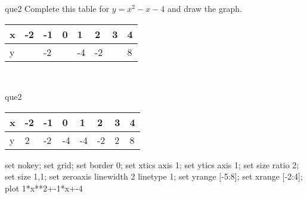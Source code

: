\documentclass[13.5pt, varwidth=true]{beamer}
\begin{document}
\begin{frame}[shrink=19,fragile]
	\begin{beamercolorbox}[rounded=true, left, shadow=true,wd=14.8cm]{que2}
		 Complete this table for $y = x^{2} - x - 4$ and draw the graph. \\[0.3cm] \renewcommand{\arraystretch}{1.2}\begin{tabular}{|C|C|C|C|C|C|C|C|} \hline x & -2 & -1 & 0 & 1 & 2 & 3 & 4 \\ \hline y &  & -2 &  & -4 & -2 &  & 8\\ \hline \end{tabular}\\[0.3cm]
	\end{beamercolorbox}
\end{frame}
\begin{frame}[shrink=19,fragile]
	\begin{beamercolorbox}[rounded=true, left, shadow=true,wd=14.8cm]{que2}
		\renewcommand{\arraystretch}{1.2}\begin{tabular}{|C|C|C|C|C|C|C|C|} \hline x & -2 & -1 & 0 & 1 & 2 & 3 & 4 \\ \hline y & 2 & -2 & -4 & -4 & -2 & 2 & 8\\ \hline \end{tabular}\begin{gnuplot}[terminal=pdf] set nokey; set grid; set border 0; set xtics axis 1; set ytics axis 1; set size ratio 2; set size 1,1; set zeroaxis linewidth 2 linetype 1; set yrange [-5:8]; set xrange [-2:4]; plot 1*x**2+-1*x+-4 \end{gnuplot}
	\end{beamercolorbox}
\end{frame}
\end{document}
